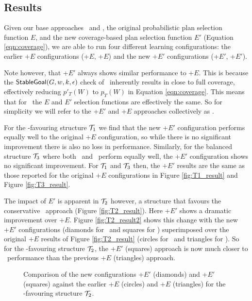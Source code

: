 \subsection{Results}

Given our base approaches \CL\ and \BUL, the original probabilistic
plan selection function $E$, and the new coverage-based plan selection
function $E'$ (Equation \ref{eqn:coverage}), we are able to run four
different learning configurations: the earlier $+E$ configurations
(\CL+$E$, \BUL+$E$) and the new $+E'$ configurations (\CL+$E'$,
\BUL+$E'$). 

Note however, that \BUL+$E'$ always shows similar performance to
\BUL+$E$. This is because the $\mathsf{StableGoal}(G,w,k,\epsilon)$ check of
\BUL\ inherently results in close to full coverage, effectively
reducing $p'_T(W)$ to $p_T(W)$ in Equation \ref{eqn:coverage}. This
means that for \BUL\, the $E$ and $E'$ selection functions are
effectively the same. So for simplicity we will refer to the \BUL+$E'$
and \BUL+$E$ approaches collectively as \BUL. 

For the \CL-favouring structure ${\mathcal{T}}_1$ we find that the new \CL+$E'$
configuration performs equally well to the original \CL+$E$
configuration, so while there is no significant improvement there is
also no loss in performance. Similarly, for the balanced structure
${\mathcal{T}}_3$ where both \CL\ and \BUL\ perform equally well, the \CL+$E'$
configuration shows no significant improvement. For ${\mathcal{T}}_1$ and ${\mathcal{T}}_3$
then, the $+E'$ results are the same as those reported for the
original $+E$ configurations in Figure \ref{fig:T1_result} and Figure
\ref{fig:T3_result}. 

The impact of $E'$ is apparent in $\T_2$ however, a structure that
favours the conservative \BUL\ approach (Figure
\ref{fig:T2_result}). Here \CL+$E'$ shows a dramatic improvement over
\CL+$E$. Figure \ref{fig:T2_result2} shows this change with the new
$+E'$ configurations (diamonds for \BUL\ and squares for \CL)
superimposed over the original $+E$ results of Figure
\ref{fig:T2_result} (circles for \BUL\ and triangles for \CL). So for
the \BUL-favouring structure $\T_2$, the \CL+$E'$ (squares) approach
is now much closer to \BUL\ performance than the previous \CL+$E$
(triangles) approach. 


\begin{figure*}[t]
\begin{center}
\subfigure[Structure $\T_2$]{\label{fig:T2_result2}

}
\qquad
\subfigure[Structure $\T_4$]{\label{fig:T4_result}

}

\caption{Comparison of the new configurations \BUL+$E'$ (diamonds) and \CL+$E'$
(squares) against the earlier \BUL+$E$ (circles) and \CL+$E$ (triangles) for the
\BUL-favouring structure $\T_2$.}
\end{center}
\end{figure*}


